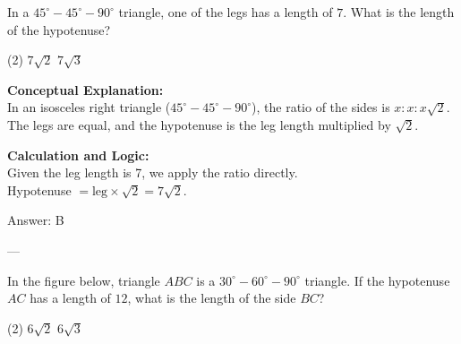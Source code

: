 \documentclass[11pt,paper=a4,answers]{exam}
\begin{document}
\begin{questions}
\pointsinrightmargin
\pointsdroppedatright
\marksnotpoints
{}
\pointformat{\boldmath\themarginpoints}
\bracketedpoints



\question
In a $45^\circ-45^\circ-90^\circ$ triangle, one of the legs has a length of $7$. What is the length of the hypotenuse?
\begin{tasks}(2)
    \task $7\sqrt{2}$
    \task $7\sqrt{3}$
\end{tasks}

\begin{solution}
\textbf{Conceptual Explanation:} \\
In an isosceles right triangle ($45^\circ-45^\circ-90^\circ$), the ratio of the sides is $x : x : x\sqrt{2}$. The legs are equal, and the hypotenuse is the leg length multiplied by $\sqrt{2}$.

\vspace{10pt}
\textbf{Calculation and Logic:} \\
Given the leg length is 7, we apply the ratio directly. \\
Hypotenuse $= \text{leg} \times \sqrt{2} = 7\sqrt{2}$.

\vspace{15pt}
Answer: \colorbox{yellow!100}{B}
\end{solution}

---

\question
In the figure below, triangle $ABC$ is a $30^\circ-60^\circ-90^\circ$ triangle. If the hypotenuse $AC$ has a length of $12$, what is the length of the side $BC$?
\begin{center}
\end{center}
\begin{tasks}(2)
    \task $6\sqrt{2}$
    \task $6\sqrt{3}$
\end{tasks}


\end{questions}
\end{document}
